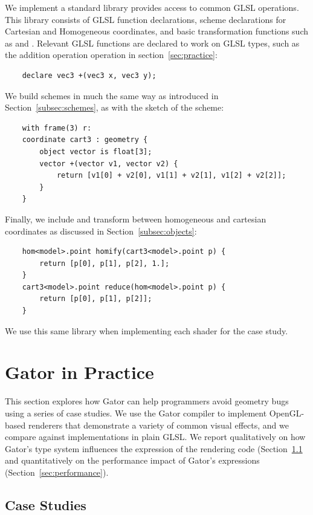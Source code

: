 \documentclass[../main.tex]{subfiles}
\begin{document}
{We implement a standard library provides access to common GLSL operations.  This library consists of GLSL function declarations, scheme declarations for Cartesian and Homogeneous coordinates, and basic transformation functions such as  and .  Relevant GLSL functions are declared to work on GLSL types, such as the addition operation operation in section~\ref{sec:practice}:
%
\begin{lstlisting}
	declare vec3 +(vec3 x, vec3 y);
\end{lstlisting}
%
We build schemes in much the same way as introduced in Section~\ref{subsec:schemes}, as with the sketch of the  scheme:
%
\begin{lstlisting}
	with frame(3) r:
	coordinate cart3 : geometry {
		object vector is float[3];
		vector +(vector v1, vector v2) {
			return [v1[0] + v2[0], v1[1] + v2[1], v1[2] + v2[2]];
		}
	}
\end{lstlisting}
%
Finally, we include  and  transform between homogeneous and cartesian coordinates as discussed in Section~\ref{subsec:objects}:
%
\begin{lstlisting}
	hom<model>.point homify(cart3<model>.point p) {
		return [p[0], p[1], p[2], 1.]; 
	}
	cart3<model>.point reduce(hom<model>.point p) {
		return [p[0], p[1], p[2]]; 
	}
\end{lstlisting}
%
We use this same library when implementing each shader for the case study.
\section{Gator in Practice}
\label{sec:inpractice}

This section explores how Gator can help programmers avoid geometry bugs using a series of case studies.
We use the Gator compiler to implement OpenGL-based renderers that demonstrate a variety of common visual effects,
and we compare against implementations in plain GLSL.
We report qualitatively on how Gator's type system influences the expression of the rendering code (Section~\ref{sec:casestudies} and quantitatively on the performance impact of Gator's  expressions (Section~\ref{sec:performance}).

\subsection{Case Studies}
\label{sec:casestudies}

}
\end{document}
